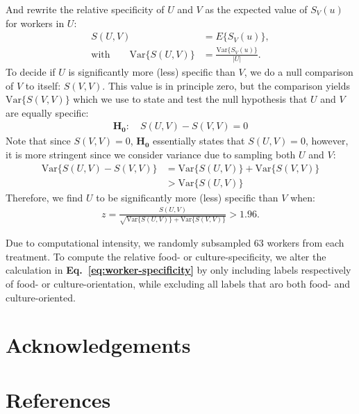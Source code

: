 \documentclass[a4paper]{report}
\begin{document}
And rewrite the relative specificity of $U$ and $V$ as the expected value of
$S_V(u)$ for workers in $U$:
\begin{align}
	S(U,V) &= E\{S_V(u)\}, \\
	\text{with} \quad\quad \text{Var}\{S(U,V)\} 
		&= \frac{\text{Var}\{S_V(u)\}}{|U|}.
\end{align}
To decide if $U$ is significantly more (less) specific than $V$, we do
a null comparison of $V$ to itself: $S(V,V)$.  This value is in principle zero,
but the comparison yields $\text{Var}\{S(V,V)\}$ which we use to state and 
test the null hypothesis that $U$ and $V$ are equally specific:
\begin{align}
	\mathbf{H_0}: \quad S(U,V)-S(V,V)=0
\end{align}
Note that since $S(V,V)=0$, $\mathbf{H_0}$ essentially states that $S(U,V)=0$,
however, it is more stringent since we consider variance due to sampling both
$U$ and $V$:
\begin{align}
\text{Var}\{S(U,V) - S(V,V)\} &= \text{Var}\{S(U,V)\} + \text{Var}\{S(V,V)\}\\
						&> \text{Var}\{S(U,V)\}
\end{align}
Therefore, we find $U$ to be significantly more (less) specific than $V$ when:
\begin{align}
z = \frac{S(U,V)}{ \sqrt{ \text{Var}\{S(U,V)\} + \text{Var}\{S(V,V)\} }} 
	> 1.96.
\end{align}

Due to 
computational intensity, we randomly subsampled 63 workers from each treatment.
To compute the relative food- or culture-specificity, we alter the calculation
in \textbf{Eq.~\ref{eq:worker-specificity}} by only including labels 
respectively of food- or culture-orientation, while excluding all labels that
aro both food- and culture-oriented.



\section*{Acknowledgements}
\section*{References}
\begingroup
\renewcommand{\chapter}[2]{}

\endgroup
 
\end{document}
